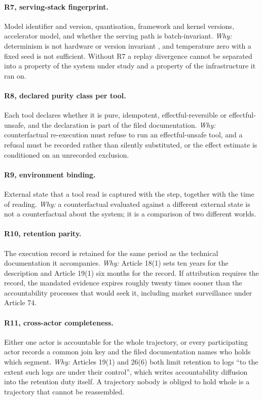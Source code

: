 \documentclass[11pt]{article}
\theoremstyle{remark}
\begin{document}
\paragraph{R7, serving-stack fingerprint.} Model identifier and version,
quantisation, framework and kernel versions, accelerator model, and whether the
serving path is batch-invariant. \emph{Why:} determinism is not hardware or
version invariant \citep{he2025}, and temperature zero with a fixed seed is not
sufficient. Without R7 a replay divergence cannot be separated into a property of
the system under study and a property of the infrastructure it ran on.

\paragraph{R8, declared purity class per tool.} Each tool declares whether it is
pure, idempotent, effectful-reversible or effectful-unsafe, and the declaration is
part of the filed documentation. \emph{Why:} counterfactual re-execution must
refuse to run an effectful-unsafe tool, and a refusal must be recorded rather
than silently substituted, or the effect estimate is conditioned on an unrecorded
exclusion.

\paragraph{R9, environment binding.} External state that a tool read is captured
with the step, together with the time of reading. \emph{Why:} a counterfactual
evaluated against a different external state is not a counterfactual about the
system; it is a comparison of two different worlds.

\paragraph{R10, retention parity.} The execution record is retained for the same
period as the technical documentation it accompanies. \emph{Why:} Article 18(1)
sets ten years for the description and Article 19(1) six months for the record. If
attribution requires the record, the mandated evidence expires roughly twenty
times sooner than the accountability processes that would seek it, including
market surveillance under Article 74.

\paragraph{R11, cross-actor completeness.} Either one actor is accountable for the
whole trajectory, or every participating actor records a common join key and the
filed documentation names who holds which segment. \emph{Why:} Articles 19(1) and
26(6) both limit retention to logs ``to the extent such logs are under their
control'', which writes accountability diffusion into the retention duty itself. A
trajectory nobody is obliged to hold whole is a trajectory that cannot be
reassembled.
\end{document}
